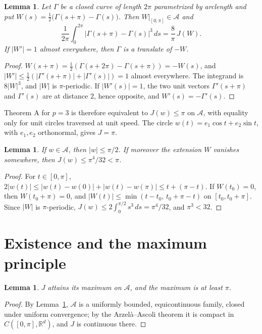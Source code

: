 \documentclass[11pt]{amsart}
\newtheorem{lemma}[theorem]{Lemma}
\theoremstyle{definition}
\theoremstyle{remark}
\newcommand{\R}{\mathbb{R}}
\newcommand{\cA}{\mathcal{A}}
\begin{document}
\begin{lemma}\label{lem:reduction}
Let $\Gamma$ be a closed curve of length $2\pi$ parametrized by arclength and put $W(s)=\tfrac12\bigl(\Gamma(s+\pi)-\Gamma(s)\bigr)$. Then $W|_{[0,\pi]}\in\cA$ and
\[
\frac1{2\pi}\int_0^{2\pi}|\Gamma(s+\pi)-\Gamma(s)|^3\,ds=\frac8\pi\,J(W).
\]
If $|W'|=1$ almost everywhere, then $\Gamma$ is a translate of $-W$.
\end{lemma}

\begin{proof}
$W(s+\pi)=\frac12(\Gamma(s+2\pi)-\Gamma(s+\pi))=-W(s)$, and $|W'|\le\frac12(|\Gamma'(s+\pi)|+|\Gamma'(s)|)=1$ almost everywhere. The integrand is $8|W|^3$, and $|W|$ is $\pi$-periodic. If $|W'(s)|=1$, the two unit vectors $\Gamma'(s+\pi)$ and $\Gamma'(s)$ are at distance $2$, hence opposite, and $W'(s)=-\Gamma'(s)$.
\end{proof}

Theorem A for $p=3$ is therefore equivalent to $J(w)\le\pi$ on $\cA$, with equality only for unit circles traversed at unit speed. The circle $w(t)=e_1\cos t+e_2\sin t$, with $e_1,e_2$ orthonormal, gives $J=\pi$.

\begin{lemma}\label{lem:zero}
If $w\in\cA$, then $|w|\le\pi/2$. If moreover the extension $W$ vanishes somewhere, then $J(w)\le\pi^4/32<\pi$.
\end{lemma}

\begin{proof}
For $t\in[0,\pi]$, $2|w(t)|\le|w(t)-w(0)|+|w(t)-w(\pi)|\le t+(\pi-t)$. If $W(t_0)=0$, then $W(t_0+\pi)=0$, and $|W(t)|\le\min(t-t_0,\,t_0+\pi-t)$ on $[t_0,t_0+\pi]$. Since $|W|$ is $\pi$-periodic, $J(w)\le2\int_0^{\pi/2}s^3\,ds=\pi^4/32$, and $\pi^3<32$.
\end{proof}

\section{Existence and the maximum principle}\label{sec:pmp}

\begin{lemma}\label{lem:exist}
$J$ attains its maximum on $\cA$, and the maximum is at least $\pi$.
\end{lemma}

\begin{proof}
By Lemma~\ref{lem:zero}, $\cA$ is a uniformly bounded, equicontinuous family, closed under uniform convergence; by the Arzel\`a--Ascoli theorem it is compact in $C([0,\pi],\R^d)$, and $J$ is continuous there.
\end{proof}
\end{document}
